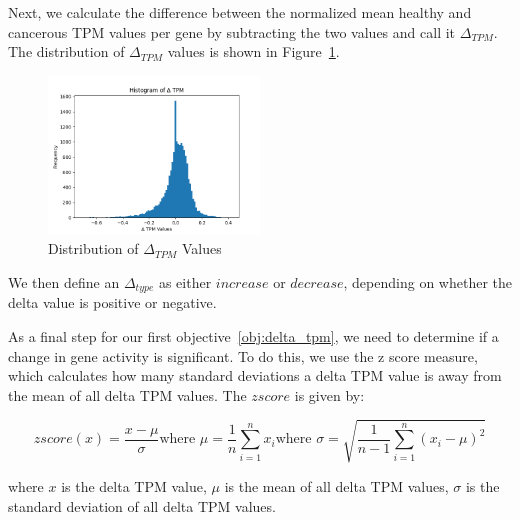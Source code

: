 Next, we calculate the difference between the normalized mean healthy and cancerous TPM values per gene
by subtracting the two values and call it $\Delta_{TPM}$.
The distribution of $\Delta_{TPM}$ values is shown in Figure~\ref{fig:03_02_delta_tpm}.

\begin{figure}[h]
    \centering
    \includegraphics[width=0.5\textwidth]{figures/03_02_delta_tpm}
    \caption{Distribution of $\Delta_{TPM}$ Values}
    \label{fig:03_02_delta_tpm}
\end{figure}

We then define an $\Delta_{type}$ as either $increase$ or $decrease$, depending on whether the delta value is positive or negative.

As a final step for our first objective~\ref{obj:delta_tpm}, we need to determine if a change in gene activity is significant. %
To do this, we use the z score measure, which calculates how many standard deviations a delta TPM value is away
from the mean of all delta TPM values.
The $z score$ is given by:

\begin{subequations}
    \begin{equation} \label{eq:z_score}
        z score (x) = \frac{x - {\mu}}{\sigma}
    \end{equation}
    \begin{equation}
        \text{where } \mu = \frac{1}{n} \sum_{i=1}^{n} x_i
        \label{eq:mean}
    \end{equation}
    \begin{equation}
        \text{where } \sigma = \sqrt{\frac{1}{n-1} \sum_{i=1}^{n} (x_i - \mu)^2}
        \label{eq:std}
    \end{equation}
\end{subequations}

where $x$ is the delta TPM value, $\mu$ is the mean of all delta TPM values, $\sigma$ is the standard deviation of all delta TPM values.

